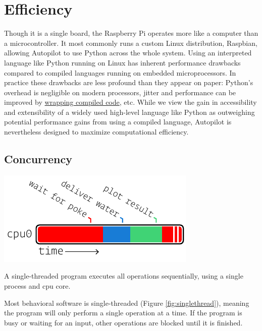 \section{Efficiency}
\label{sec:efficiency}

Though it is a single board, the Raspberry Pi operates more like a computer than a microcontroller. It most commonly runs a custom Linux distribution, Raspbian, allowing Autopilot to use Python across the whole system. Using an interpreted language like Python running on Linux has inherent performance drawbacks compared to compiled languages running on embedded microprocessors. In practice these drawbacks are less profound than they appear on paper: Python's overhead is negligible on modern processors, jitter and performance can be improved by \hyperref[sec:lowlevel]{wrapping compiled code}, etc. While we view the gain in accessibility and extensibility of a widely used high-level language like Python as outweighing potential performance gains from using a compiled language, Autopilot is nevertheless designed to maximize computational efficiency.

\subsection{Concurrency}

\begin{marginfigure}[3.5cm]
\includegraphics[]{figures/side_12_onethread.pdf}
\caption{A single-threaded program executes all operations sequentially, using a single process and cpu core.}
\label{fig:singlethread}
\end{marginfigure}

Most behavioral software is single-threaded (Figure \ref{fig:singlethread}), meaning the program will only perform a single operation at a time. If the program is busy or waiting for an input, other operations are blocked until it is finished.

